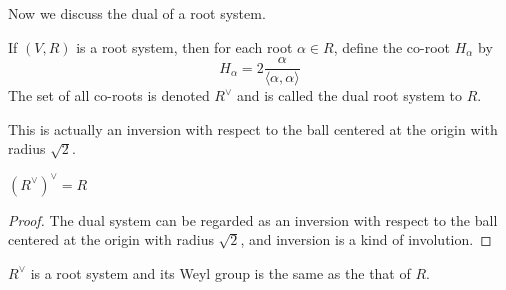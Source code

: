 Now we discuss the dual of a root system.
\begin{definition}[Co-Root]
    If $(V,R)$ is a root system, then for each root $\alpha\in R$, define the co-root $H_\alpha$ by \[H_\alpha=2\frac{\alpha}{\langle\alpha,\alpha\rangle}\] 
    The set of all co-roots is denoted $R^\vee$ and is called the dual root system to $R$.
\end{definition}
This is actually an inversion with respect to the ball centered at the origin with radius $\sqrt{2}$. 
\begin{theorem}[Duality]
    $(R^\vee)^\vee=R$
\end{theorem}
\begin{proof}
    The dual system can be regarded as an inversion with respect to the ball centered at the origin with radius $\sqrt{2}$,
    and inversion is a kind of involution.
\end{proof}
\begin{theorem}
    $R^\vee$ is a root system and its Weyl group is the same as the that of $R$. 
\end{theorem}


